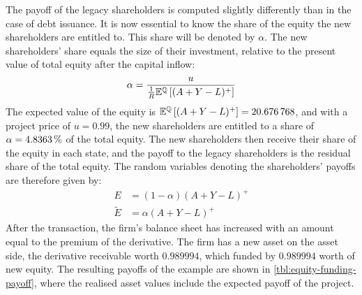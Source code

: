 \documentclass[main.tex]{subfiles}
\begin{document}
        The payoff of the legacy shareholders is computed slightly differently than in the case of debt issuance. 
        It is now essential to know the share of the equity the new shareholders are entitled to.
        This share will be denoted by $\alpha$.
        The new shareholders' share equals the size of their investment,
        relative to the present value of total equity after the capital inflow:
        \begin{equation*}
            \alpha = 
                \frac{
                    u
                }{
                    \frac{1}{R}
                    \mathbb{E}^{\mathbb{Q}}\left[
                        (A + Y - L)^{+}
                    \right]
                }
        \end{equation*}
        The expected value of the equity is 
        $\mathbb{E}^{\mathbb{Q}}\left[(A + Y - L)^{+}\right] = \num{20.676768}$,
        and with a project price of $u = 0.99$, the new shareholders are entitled to a share of
        $\alpha = \pct{0.048363}$ of the total equity.
        The new shareholders then receive their share of the equity in each state, 
        and the payoff to the legacy shareholders is the residual share of the total equity.
        The random variables denoting the shareholders' payoffs are therefore given by:
            \begin{align*}
                E 
                &= 
                (1 - \alpha)
                (A + Y - L)^{+} 
                \\
                \tilde{E}
                &=
                \alpha
                (A + Y - L)^{+}
            \end{align*}
        \indent
        After the transaction, the firm's balance sheet has increased with an amount equal to the premium of the derivative. 
        The firm has a new asset on the asset side, the derivative receivable worth $\num{0.989994}$, which funded by $\num{0.989994}$ worth of new equity.
        The resulting payoffs of the example are shown in \cref{tbl:equity-funding-payoff},
        where the realised asset values include the expected payoff of the project.
\end{document}
